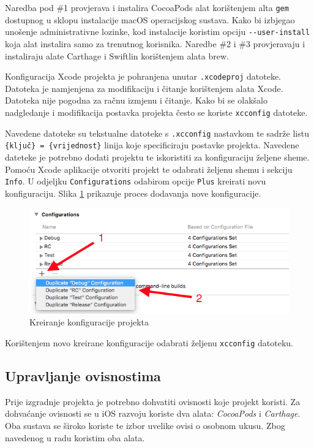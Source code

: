\documentclass[times, utf8, diplomski, numeric]{fer}
\begin{document}
Naredba pod \#1 provjerava i instalira CocoaPods alat korištenjem alta \verb|gem| dostupnog u sklopu instalacije macOS operacijskog sustava. Kako bi izbjegao unošenje administrativne lozinke, kod instalacije koristim opciju \verb|--user-install| koja alat instalira samo za trenutnog korisnika. Naredbe \#2 i \#3 provjeravaju i instaliraju alate Carthage i Swiftlin korištenjem alata brew.


Konfiguracija Xcode projekta je pohranjena unutar \verb|.xcodeproj| datoteke. Datoteka je namjenjena za modifikaciju i čitanje korištenjem alata Xcode. Datoteka nije pogodna za račnu izmjenu i čitanje. Kako bi se olakšalo nadgledanje i modifikacija postavka projekta često se koriste \verb|xcconfig| datoteke.

Navedene datoteke su tekstualne datoteke s \verb|.xcconfig| nastavkom te sadrže listu \verb|{ključ} = {vrijednost}| linija koje specificiraju postavke projekta. Navedene dateteke je potrebno dodati projektu te iskoristiti za konfiguraciju željene sheme. Pomoću Xcode aplikacije otvoriti projekt te odabrati željenu shemu i sekciju \verb|Info|. U odjeljku \verb|Configurations| odabirom opcije \verb|Plus| kreirati novu konfiguraciju. Slika \ref{fig:XcodeConfigurations} prikazuje proces dodavanja nove konfiguracije.

\begin{figure}[h!]
\centering
\includegraphics[scale=0.7]{XcodeConfigurations}
\caption{Kreiranje konfiguracije projekta}
\label{fig:XcodeConfigurations}
\end{figure}

Korištenjem novo kreirane konfiguracije odabrati željenu \verb|xcconfig| datoteku.

\subsection{Upravljanje ovisnostima}

Prije izgradnje projekta je potrebno dohvatiti ovisnosti koje projekt koristi. Za dohvaćanje ovisnosti se u iOS razvoju koriste dva alata: \textit{CocoaPods} i \textit{Carthage}. Oba sustava se široko koriste te izbor uvelike ovisi o osobnom ukusu. Zbog navedenog u radu koristim oba alata.
\end{document}
